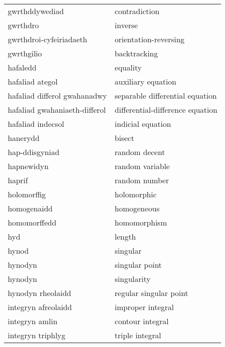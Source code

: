 \begin{supertabular}{p{0.22\textwidth}p{0.22\textwidth}}
                 gwrthddywediad &                    contradiction \\
                       gwrthdro &                          inverse \\
        gwrthdroi-cyfeiriadaeth &            orientation-reversing \\
                     gwrthgilio &                     backtracking \\
                       hafaledd &                         equality \\
                hafaliad ategol &               auxiliary equation \\
   hafaliad differol gwahanadwy &  separable differential equation \\
  hafaliad gwahaniaeth-differol & differential-difference equation \\
              hafaliad indecsol &                indicial equation \\
                       hanerydd &                           bisect \\
                 hap-ddisgyniad &                    random decent \\
                     hapnewidyn &                  random variable \\
                         haprif &                    random number \\
                    holomorffig &                      holomorphic \\
                    homogenaidd &                      homogeneous \\
                   homomorffedd &                     homomorphism \\
                            hyd &                           length \\
                          hynod &                         singular \\
                        hynodyn &                   singular point \\
                        hynodyn &                      singularity \\
              hynodyn rheolaidd &           regular singular point \\
            integryn afreolaidd &                improper integral \\
                 integryn amlin &                 contour integral \\
              integryn triphlyg &                  triple integral \\

\end{supertabular}
